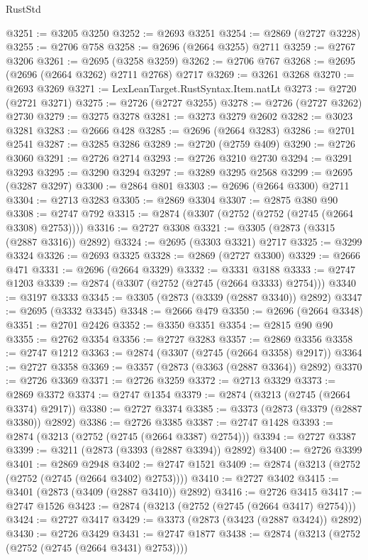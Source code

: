 \begin{lexlean}{RustStd}
\begin{coremodule}
@3251 := @3205 @3250
@3252 := @2693 @3251
@3254 := @2869 (@2727 @3228)
@3255 := @2706 @758
@3258 := @2696 (@2664 @3255) @2711
@3259 := @2767 @3206
@3261 := @2695 (@3258 @3259)
@3262 := @2706 @767
@3268 := @2695 (@2696 (@2664 @3262) @2711 @2768) @2717
@3269 := @3261 @3268
@3270 := @2693 @3269
@3271 := LexLeanTarget.RustSyntax.Item.natLt
@3273 := @2720 (@2721 @3271)
@3275 := @2726 (@2727 @3255)
@3278 := @2726 (@2727 @3262) @2730
@3279 := @3275 @3278
@3281 := @3273 @3279 @2602
@3282 := @3023 @3281
@3283 := @2666 @428
@3285 := @2696 (@2664 @3283)
@3286 := @2701 @2541
@3287 := @3285 @3286
@3289 := @2720 (@2759 @409)
@3290 := @2726 @3060
@3291 := @2726 @2714
@3293 := @2726 @3210 @2730
@3294 := @3291 @3293
@3295 := @3290 @3294
@3297 := @3289 @3295 @2568
@3299 := @2695 (@3287 @3297)
@3300 := @2864 @801
@3303 := @2696 (@2664 @3300) @2711
@3304 := @2713 @3283
@3305 := @2869 @3304
@3307 := @2875 @380 @90
@3308 := @2747 @792
@3315 := @2874 (@3307 (@2752 (@2752 (@2745 (@2664 @3308) @2753))))
@3316 := @2727 @3308
@3321 := @3305 (@2873 (@3315 (@2887 @3316)) @2892)
@3324 := @2695 (@3303 @3321) @2717
@3325 := @3299 @3324
@3326 := @2693 @3325
@3328 := @2869 (@2727 @3300)
@3329 := @2666 @471
@3331 := @2696 (@2664 @3329)
@3332 := @3331 @3188
@3333 := @2747 @1203
@3339 := @2874 (@3307 (@2752 (@2745 (@2664 @3333) @2754)))
@3340 := @3197 @3333
@3345 := @3305 (@2873 (@3339 (@2887 @3340)) @2892)
@3347 := @2695 (@3332 @3345)
@3348 := @2666 @479
@3350 := @2696 (@2664 @3348)
@3351 := @2701 @2426
@3352 := @3350 @3351
@3354 := @2815 @90 @90
@3355 := @2762 @3354
@3356 := @2727 @3283
@3357 := @2869 @3356
@3358 := @2747 @1212
@3363 := @2874 (@3307 (@2745 (@2664 @3358) @2917))
@3364 := @2727 @3358
@3369 := @3357 (@2873 (@3363 (@2887 @3364)) @2892)
@3370 := @2726 @3369
@3371 := @2726 @3259
@3372 := @2713 @3329
@3373 := @2869 @3372
@3374 := @2747 @1354
@3379 := @2874 (@3213 (@2745 (@2664 @3374) @2917))
@3380 := @2727 @3374
@3385 := @3373 (@2873 (@3379 (@2887 @3380)) @2892)
@3386 := @2726 @3385
@3387 := @2747 @1428
@3393 := @2874 (@3213 (@2752 (@2745 (@2664 @3387) @2754)))
@3394 := @2727 @3387
@3399 := @3211 (@2873 (@3393 (@2887 @3394)) @2892)
@3400 := @2726 @3399
@3401 := @2869 @2948
@3402 := @2747 @1521
@3409 := @2874 (@3213 (@2752 (@2752 (@2745 (@2664 @3402) @2753))))
@3410 := @2727 @3402
@3415 := @3401 (@2873 (@3409 (@2887 @3410)) @2892)
@3416 := @2726 @3415
@3417 := @2747 @1526
@3423 := @2874 (@3213 (@2752 (@2745 (@2664 @3417) @2754)))
@3424 := @2727 @3417
@3429 := @3373 (@2873 (@3423 (@2887 @3424)) @2892)
@3430 := @2726 @3429
@3431 := @2747 @1877
@3438 := @2874 (@3213 (@2752 (@2752 (@2745 (@2664 @3431) @2753))))

\end{coremodule}
\end{lexlean}
